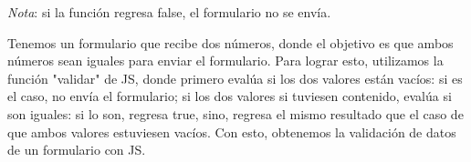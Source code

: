 \textit{Nota}: si la función regresa false, el formulario no se envía.

Tenemos un formulario que recibe dos números, donde el objetivo es que ambos números sean iguales para enviar el formulario. Para lograr esto, utilizamos la función "validar" de JS, donde primero evalúa si los dos valores están vacíos: si es el caso, no envía el formulario; si los dos valores si tuviesen contenido, evalúa si son iguales: si lo son, regresa true, sino, regresa el mismo resultado que el caso de que ambos valores estuviesen vacíos. Con esto, obtenemos la validación de datos de un formulario con JS.
